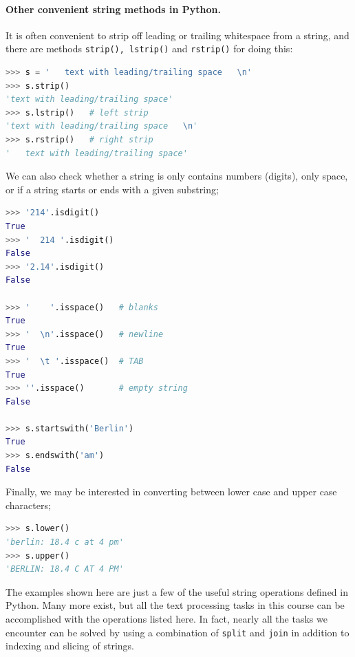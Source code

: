 \documentclass[graybox,envcountchap,sectrefs,final]{svmonodo}
\begin{document}
\paragraph{Other convenient string methods in Python.}
It is often convenient to strip off leading or trailing whitespace from a string, and there are methods \texttt{strip(), lstrip()} and
\texttt{rstrip()} for doing this:
\begin{lstlisting}[language=Python,style=blue1]
>>> s = '   text with leading/trailing space   \n'
>>> s.strip()
'text with leading/trailing space'
>>> s.lstrip()   # left strip
'text with leading/trailing space   \n'
>>> s.rstrip()   # right strip
'   text with leading/trailing space'
\end{lstlisting}
We can also check whether a string is only contains numbers (digits), only space, or if a string starts or ends with a given substring;
\begin{lstlisting}[language=Python,style=blue1]
>>> '214'.isdigit()
True
>>> '  214 '.isdigit()
False
>>> '2.14'.isdigit()
False

>>> '    '.isspace()   # blanks
True
>>> '  \n'.isspace()   # newline
True
>>> '  \t '.isspace()  # TAB
True
>>> ''.isspace()       # empty string
False

>>> s.startswith('Berlin')
True
>>> s.endswith('am')
False
\end{lstlisting}
Finally, we may be interested in converting between lower case and upper case characters;
\begin{lstlisting}[language=Python,style=blue1]
>>> s.lower()
'berlin: 18.4 c at 4 pm'
>>> s.upper()
'BERLIN: 18.4 C AT 4 PM'
\end{lstlisting}
The examples shown here are just a few of the useful string operations defined in Python. Many more exist, but all the
text processing tasks in this course can be accomplished with the operations listed here. In fact, nearly all the tasks
we encounter can be solved by using a combination of \texttt{split} and \texttt{join} in addition to indexing and slicing of strings.
\end{document}
